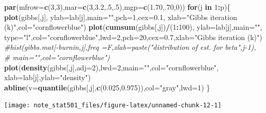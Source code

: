 \documentclass[
]{article}
\newenvironment{Shaded}{\begin{snugshade}}{\end{snugshade}}
\newcommand{\CommentTok}[1]{\textcolor[rgb]{0.56,0.35,0.01}{\textit{#1}}}
\newcommand{\ControlFlowTok}[1]{\textcolor[rgb]{0.13,0.29,0.53}{\textbf{#1}}}
\newcommand{\DataTypeTok}[1]{\textcolor[rgb]{0.13,0.29,0.53}{#1}}
\newcommand{\DecValTok}[1]{\textcolor[rgb]{0.00,0.00,0.81}{#1}}
\newcommand{\FloatTok}[1]{\textcolor[rgb]{0.00,0.00,0.81}{#1}}
\newcommand{\KeywordTok}[1]{\textcolor[rgb]{0.13,0.29,0.53}{\textbf{#1}}}
\newcommand{\NormalTok}[1]{#1}
\newcommand{\OperatorTok}[1]{\textcolor[rgb]{0.81,0.36,0.00}{\textbf{#1}}}
\newcommand{\StringTok}[1]{\textcolor[rgb]{0.31,0.60,0.02}{#1}}
\begin{document}
\begin{Shaded}
\begin{Highlighting}[]
\KeywordTok{par}\NormalTok{(}\DataTypeTok{mfrow=}\KeywordTok{c}\NormalTok{(}\DecValTok{3}\NormalTok{,}\DecValTok{3}\NormalTok{),}\DataTypeTok{mar=}\KeywordTok{c}\NormalTok{(}\DecValTok{3}\NormalTok{,}\FloatTok{3.2}\NormalTok{,.}\DecValTok{5}\NormalTok{,.}\DecValTok{5}\NormalTok{),}\DataTypeTok{mgp=}\KeywordTok{c}\NormalTok{(}\FloatTok{1.70}\NormalTok{,.}\DecValTok{70}\NormalTok{,}\DecValTok{0}\NormalTok{))}
\ControlFlowTok{for}\NormalTok{(j }\ControlFlowTok{in} \DecValTok{1}\OperatorTok{:}\NormalTok{p)\{}
\KeywordTok{plot}\NormalTok{(gibbs[,j],  }\DataTypeTok{ylab=}\NormalTok{lab[j],}\DataTypeTok{main=}\StringTok{""}\NormalTok{,}\DataTypeTok{pch=}\DecValTok{1}\NormalTok{,}\DataTypeTok{cex=}\FloatTok{0.1}\NormalTok{,}
     \DataTypeTok{xlab=}\StringTok{"Gibbs iteration (k)"}\NormalTok{,}\DataTypeTok{col=}\StringTok{"cornflowerblue"}\NormalTok{)  }
\KeywordTok{plot}\NormalTok{(}\KeywordTok{cumsum}\NormalTok{(gibbs[,j])}\OperatorTok{/}\NormalTok{(}\DecValTok{1}\OperatorTok{:}\DecValTok{100}\NormalTok{),  }\DataTypeTok{ylab=}\NormalTok{lab[j],}\DataTypeTok{main=}\StringTok{""}\NormalTok{,}
     \DataTypeTok{type=}\StringTok{"l"}\NormalTok{,}\DataTypeTok{col=}\StringTok{"cornflowerblue"}\NormalTok{,}\DataTypeTok{lwd=}\DecValTok{2}\NormalTok{,}\DataTypeTok{pch=}\DecValTok{20}\NormalTok{,}\DataTypeTok{cex=}\FloatTok{0.7}\NormalTok{,}\DataTypeTok{xlab=}\StringTok{"Gibbs iteration (k)"}\NormalTok{)}
\CommentTok{#hist(gibbs.mat[-burnin,j],freq =F,xlab=paste("distribution of est. for beta",j-1),}
\CommentTok{#     main="",col="cornflowerblue")}
\KeywordTok{plot}\NormalTok{(}\KeywordTok{density}\NormalTok{(gibbs[,j],}\DataTypeTok{adj=}\DecValTok{2}\NormalTok{),}\DataTypeTok{lwd=}\DecValTok{2}\NormalTok{,}\DataTypeTok{main=}\StringTok{""}\NormalTok{,}\DataTypeTok{col=}\StringTok{"cornflowerblue"}\NormalTok{,}
    \DataTypeTok{xlab=}\NormalTok{lab[j],}\DataTypeTok{ylab=}\StringTok{"density"}\NormalTok{)}
\KeywordTok{abline}\NormalTok{(}\DataTypeTok{v=}\KeywordTok{quantile}\NormalTok{(gibbs[,j],}\KeywordTok{c}\NormalTok{(}\FloatTok{0.025}\NormalTok{,}\FloatTok{0.975}\NormalTok{)),}\DataTypeTok{col=}\StringTok{"gray"}\NormalTok{,}\DataTypeTok{lwd=}\DecValTok{1}\NormalTok{)}
\NormalTok{\}}
\end{Highlighting}
\end{Shaded}

\begin{center}\texttt{[image: note\_stat501\_files/figure-latex/unnamed-chunk-12-1]} \end{center}
\end{document}
